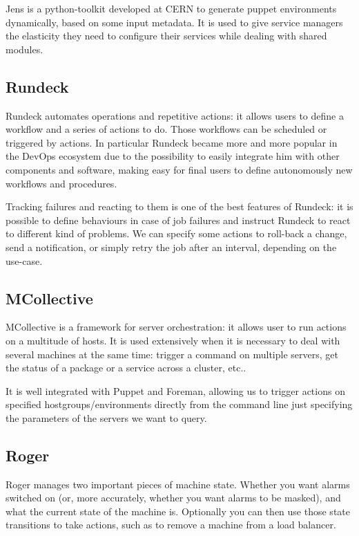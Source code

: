 Jens is a python-toolkit developed at CERN to generate puppet environments
dynamically, based on some input metadata. It is used to give service
managers the elasticity they need to configure their services while
dealing with shared modules.


\subsection{Rundeck}

Rundeck automates operations and repetitive actions: it allows users to
define a workflow and a series of actions to do. Those workflows can be
scheduled or triggered by actions. In particular Rundeck became more and
more popular in the DevOps ecosystem due to the possibility to easily
integrate him with other components and software, making easy for final
users to define autonomously new workflows and procedures.

Tracking failures and reacting to them is one of the best features of
Rundeck: it is possible to define behaviours in case of job failures and
instruct Rundeck to react to different kind of problems. We can specify
some actions to roll-back a change, send a notification, or simply retry
the job after an interval, depending on the use-case. 

\subsection{MCollective}

MCollective is a framework for server orchestration: it allows user to run
actions on a multitude of hosts. It is used extensively when it is
necessary to deal with several machines at the same time: trigger
a command on multiple servers, get the status of a package or a service
across a cluster, etc..

It is well integrated with Puppet and Foreman, allowing us to trigger
actions on specified hostgroups/environments directly from the command
line just specifying the parameters of the servers we want to query.

\subsection{Roger}

Roger manages two important pieces of machine state. Whether you want
alarms switched on (or, more accurately, whether you want alarms to be
masked), and what the current state of the machine is. Optionally you can
then use those state transitions to take actions, such as to remove
a machine from a load balancer.

